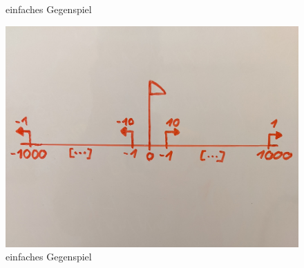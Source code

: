 \documentclass{scrartcl}
\begin{document}
\begin{figure}
\centering
{}
\caption{einfaches Gegenspiel}
\label{fig:BSP}
\end{figure}

\begin{figure}
\centering
\includegraphics[scale=0.09]{../Grafiken/Whiteboard/GegenBsp1Dim.jpg}
\caption{einfaches Gegenspiel}
\label{fig:GegenBsp1Dim}
\end{figure}
\end{document}
